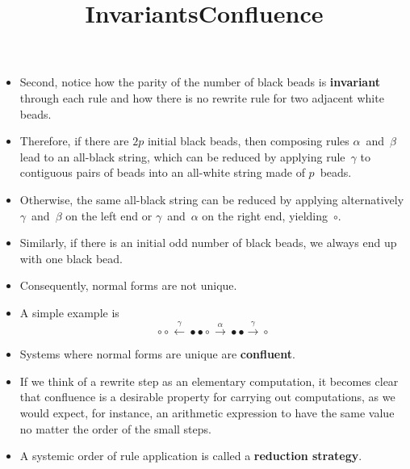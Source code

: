 \documentclass[wide]{slides}
\begin{document}
\begin{slide}
  \title{Invariants}

  \begin{itemize}

    \item Second, notice how the parity of the number of black beads
      is \textbf{invariant} through each rule and how there is no
      rewrite rule for two adjacent white beads.

    \item Therefore, if there are \(2p\) initial black beads, then
      composing rules \(\alpha\)~and~\(\beta\) lead to an
      all\hyp{}black string, which can be reduced by applying
      rule~\(\gamma\) to contiguous pairs of beads into an
      all\hyp{}white string made of \(p\)~beads.

    \item Otherwise, the same all\hyp{}black string can be reduced by
      applying alternatively \(\gamma\)~and~\(\beta\) on the left end
      or \(\gamma\)~and~\(\alpha\) on the right end,
      yielding~\(\circ\).

    \item Similarly, if there is an initial odd number of black beads,
      we always end up with one black bead.

  \end{itemize}

\end{slide}

\begin{slide}
  \title{Confluence}

  \begin{itemize}

    \item Consequently, normal forms are not unique.

    \item A simple example is
      \begin{equation*}
        \circ \circ \xleftarrow{\gamma} \bullet \bullet \circ
        \xrightarrow{\alpha} \bullet \bullet \xrightarrow{\gamma}
        \circ
      \end{equation*}

    \item Systems where normal forms are unique are
      \textbf{confluent}.

    \item If we think of a rewrite step as an elementary computation,
      it becomes clear that confluence is a desirable property for
      carrying out computations, as we would expect, for instance, an
      arithmetic expression to have the same value no matter the order
      of the small steps.

    \item A systemic order of rule application is called a
      \textbf{reduction strategy}.

  \end{itemize}

\end{slide}
\end{document}
